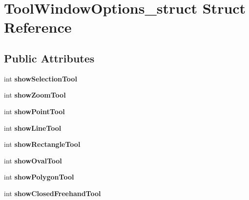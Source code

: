 \hypertarget{structToolWindowOptions__struct}{
\section{ToolWindowOptions\_\-struct Struct Reference}
\label{structToolWindowOptions__struct}
}
\subsection*{Public Attributes}
\begin{DoxyCompactItemize}
\item 
\hypertarget{structToolWindowOptions__struct_a37a2d358f7be0af2257bf40c1a329168}{
int {\bfseries showSelectionTool}}
\label{structToolWindowOptions__struct_a37a2d358f7be0af2257bf40c1a329168}

\item 
\hypertarget{structToolWindowOptions__struct_ab04079af302abbcd0aac8fb670e391a6}{
int {\bfseries showZoomTool}}
\label{structToolWindowOptions__struct_ab04079af302abbcd0aac8fb670e391a6}

\item 
\hypertarget{structToolWindowOptions__struct_ac0f0f31286f9fa9c48c402c295d40592}{
int {\bfseries showPointTool}}
\label{structToolWindowOptions__struct_ac0f0f31286f9fa9c48c402c295d40592}

\item 
\hypertarget{structToolWindowOptions__struct_ac36f5a1f4522108e54d9dcdfb6eb50c5}{
int {\bfseries showLineTool}}
\label{structToolWindowOptions__struct_ac36f5a1f4522108e54d9dcdfb6eb50c5}

\item 
\hypertarget{structToolWindowOptions__struct_a022e6d6301d916dfa05f7aeb4fe3d143}{
int {\bfseries showRectangleTool}}
\label{structToolWindowOptions__struct_a022e6d6301d916dfa05f7aeb4fe3d143}

\item 
\hypertarget{structToolWindowOptions__struct_add179e1d442985343d70ea51f3763ef8}{
int {\bfseries showOvalTool}}
\label{structToolWindowOptions__struct_add179e1d442985343d70ea51f3763ef8}

\item 
\hypertarget{structToolWindowOptions__struct_aa85b288fd947d5a40cb1f2a8748b1adc}{
int {\bfseries showPolygonTool}}
\label{structToolWindowOptions__struct_aa85b288fd947d5a40cb1f2a8748b1adc}

\item 
\hypertarget{structToolWindowOptions__struct_a486b04ec9b7dd2c3957bdf27623d6b36}{
int {\bfseries showClosedFreehandTool}}
\label{structToolWindowOptions__struct_a486b04ec9b7dd2c3957bdf27623d6b36}


\end{DoxyCompactItemize}
